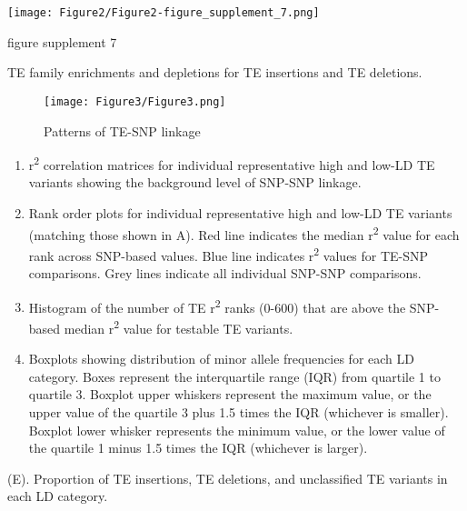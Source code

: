 \documentclass[12pt]{article}
\begin{document}
\pagebreak

\setcounter{suppfigure}{1}

\begin{suppfigure}[!ht]
  \centering
  \texttt{[image: Figure2/Figure2-figure\_supplement\_7.png]}
  \caption{figure supplement 7}
  \label{fig2s7}
\end{suppfigure}

TE family enrichments and depletions for TE insertions and TE deletions.

\pagebreak


\begin{figure}[!ht]
  \centering
  \texttt{[image: Figure3/Figure3.png]}
  \caption{Patterns of TE-SNP linkage}
  \label{fig3}
\end{figure}

\begin{enumerate}
\def\labelenumi{(\Alph{enumi})}
\item
  r\textsuperscript{2} correlation matrices for individual representative high and low-LD
  TE variants showing the background level of SNP-SNP linkage.
\item
  Rank order plots for individual representative high and low-LD TE
  variants (matching those shown in A). Red line indicates the median r\textsuperscript{2}
  value for each rank across SNP-based values. Blue line indicates r\textsuperscript{2}
  values for TE-SNP comparisons. Grey lines indicate all individual
  SNP-SNP comparisons.
\item
  Histogram of the number of TE r\textsuperscript{2} ranks (0-600) that are above the
  SNP-based median r\textsuperscript{2} value for testable TE variants.
\item
  Boxplots showing distribution of minor allele frequencies for each LD
  category. Boxes represent the interquartile range (IQR) from quartile
  1 to quartile 3. Boxplot upper whiskers represent the maximum value,
  or the upper value of the quartile 3 plus 1.5 times the IQR (whichever
  is smaller). Boxplot lower whisker represents the minimum value, or
  the lower value of the quartile 1 minus 1.5 times the IQR (whichever
  is larger).
\end{enumerate}

(E). Proportion of TE insertions, TE deletions, and unclassified TE
variants in each LD category.

\pagebreak
\end{document}
